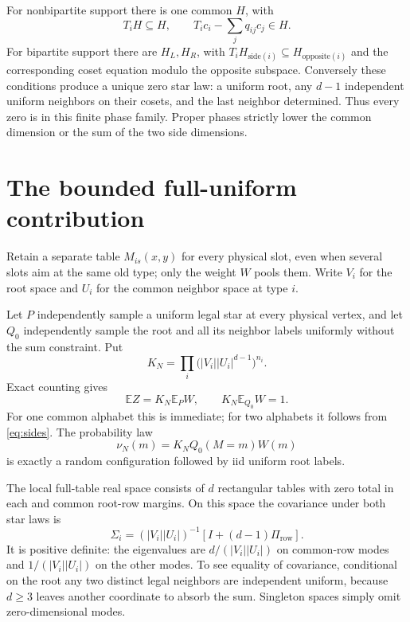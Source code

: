 \documentclass[11pt]{article}
\newcommand{\E}{\mathbb E}
\begin{document}
For nonbipartite support there is one common $H$, with
\begin{equation}\label{eq:phase}
 T_iH\subseteq H,\qquad T_ic_i-\sum_jq_{ij}c_j\in H.
\end{equation}
For bipartite support there are $H_L,H_R$, with $T_iH_{\mathrm{side}(i)}\subseteq H_{\mathrm{opposite}(i)}$ and the corresponding coset equation modulo the opposite subspace. Conversely these conditions produce a unique zero star law: a uniform root, any $d-1$ independent uniform neighbors on their cosets, and the last neighbor determined. Thus every zero is in this finite phase family. Proper phases strictly lower the common dimension or the sum of the two side dimensions.

\section{The bounded full-uniform contribution}
Retain a separate table $M_{is}(x,y)$ for every physical slot, even when several slots aim at the same old type; only the weight $W$ pools them. Write $V_i$ for the root space and $U_i$ for the common neighbor space at type $i$.

Let $P$ independently sample a uniform legal star at every physical vertex, and let $Q_0$ independently sample the root and all its neighbor labels uniformly without the sum constraint. Put
\[
 K_N=\prod_i\bigl(|V_i||U_i|^{d-1}\bigr)^{n_i}.
\]
Exact counting gives
\begin{equation}\label{eq:normalizers}
 \E Z=K_N\E_PW,
 \qquad K_N\E_{Q_0}W=1.
\end{equation}
For one common alphabet this is immediate; for two alphabets it follows from \eqref{eq:sides}. The probability law
\[
 \nu_N(m)=K_N Q_0(M=m)W(m)
\]
is exactly a random configuration followed by iid uniform root labels.

The local full-table real space consists of $d$ rectangular tables with zero total in each and common root-row margins. On this space the covariance under both star laws is
\begin{equation}\label{eq:cov}
 \Sigma_i=(|V_i||U_i|)^{-1}[I+(d-1)\Pi_{\mathrm{row}}].
\end{equation}
It is positive definite: the eigenvalues are $d/(|V_i||U_i|)$ on common-row modes and $1/(|V_i||U_i|)$ on the other modes. To see equality of covariance, conditional on the root any two distinct legal neighbors are independent uniform, because $d\ge3$ leaves another coordinate to absorb the sum. Singleton spaces simply omit zero-dimensional modes.
\end{document}
